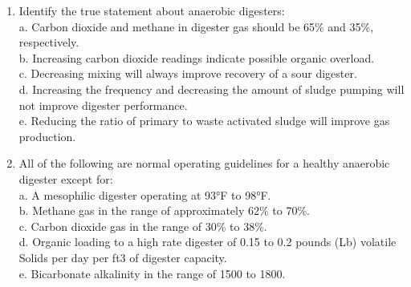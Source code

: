 \begin{tcolorbox}[breakable, enhanced,
colframe=blue!25,
colback=blue!10,
coltitle=blue!20!black,  
title= Chapter Assessment]
\begin{enumerate}
\item  Identify the true statement about anaerobic digesters: \\

a. Carbon dioxide and methane in digester gas should be 65\% and 35\%, respectively. \\
b. Increasing carbon dioxide readings indicate possible organic overload. \\
c. Decreasing mixing will always improve recovery of a sour digester. \\
d. Increasing the frequency and decreasing the amount of sludge pumping will not improve digester performance. \\
e. Reducing the ratio of primary to waste activated sludge will improve gas production. \\

\item  All of the following are normal operating guidelines for a healthy anaerobic digester except for: \\

a. A mesophilic digester operating at 93°F to 98°F. \\
b. Methane gas in the range of approximately 62\% to 70\%. \\
c. Carbon dioxide gas in the range of 30\% to 38\%. \\
d. Organic loading to a high rate digester of 0.15 to 0.2 pounds (Lb) volatile Solids per day per ft3 of digester capacity. \\
e. Bicarbonate alkalinity in the range of 1500 to 1800. \\




\end{enumerate}
\end{tcolorbox}

